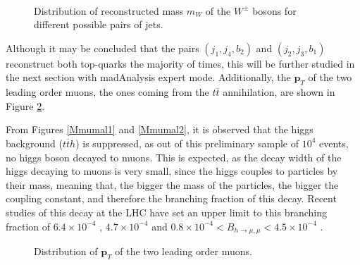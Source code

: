 \begin{figure}[ht!]
     \begin{center}
        \\
    \end{center}
    \caption{Distribution of reconstructed mass $m_{W}$ of the $W^{\pm}$ bosons for different possible pairs of jets.} 
    \label{MWbienymal}
\end{figure}

Although it may be concluded that the pairs $(j_1, j_4, b_2)$ and $(j_2, j_3, b_1)$ reconstruct both top-quarks the majority of times, this will be further studied in the next section with madAnalysis expert mode. Additionally, the $\bm{p}_T$ of the two leading order muons, the ones coming from the $t\overline t$ annihilation, are shown in Figure \ref{Mmumal}.

From Figures \ref{Mmumal1} and \ref{Mmumal2}, it is observed that the higgs background ($t\overline th$) is suppressed, as out of this preliminary sample of $10^4$ events, no higgs boson decayed to muons. This is expected, as the decay width of the higgs decaying to muons is very small, since the higgs couples to particles by their mass, meaning that, the bigger the mass of the particles, the bigger the coupling constant, and therefore the branching fraction of this decay. Recent studies of this decay at the LHC have set an upper limit to this branching fraction of $6.4\times10^{-4}$ \cite{higgs1}, $4.7\times10^{-4}$ \cite{higgs2} and $0.8\times10^{-4} < B_{h \rightarrow \mu,\mu} < 4.5\times10^{-4}$ \cite{higgsmumu}.

\begin{figure}[ht!]
     \begin{center}
    \end{center}
    \caption{Distribution of $\bm{p}_T$ of the two leading order muons.} 
    \label{Mmumal}
\end{figure}

